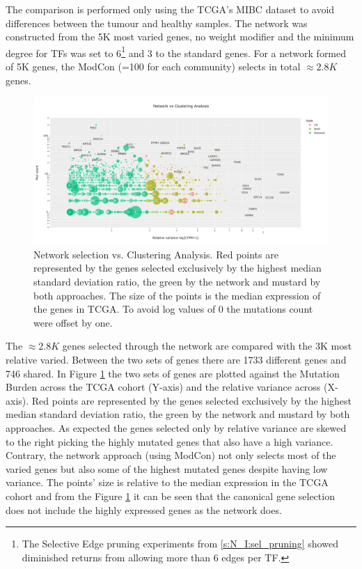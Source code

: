 The comparison is performed only using the TCGA's MIBC dataset to avoid differences between the tumour and healthy samples. The network was constructed from the 5K most varied genes, no weight modifier and the minimum degree for TFs  was set to 6\footnote{The Selective Edge pruning experiments from \cref{s:N_I:sel_pruning} showed diminished returns from allowing more than 6 edges per TF.} and 3 to the standard genes. For a network formed of 5K genes, the ModCon (=100 for each community) selects in total $\approx2.8K$ genes.


\begin{figure}[!t]    
    \centering\includegraphics[width=1.0\textwidth,keepaspectratio]{Sections/Network_I/Resources/Tum_network/ClusteringAnalysis_vs_Network_3.png}
    \caption{Network selection vs. Clustering Analysis. Red points are represented by the genes selected exclusively by the highest median standard deviation ratio, the green by the network and mustard by both approaches. The size of the points is the median expression of the genes in TCGA. To avoid log values of 0 the mutations count were offset by one.}
    \label{fig:N_I:network_ca_selection}
\end{figure}


The $\approx2.8K$ genes selected through the network are compared with the 3K most relative varied. Between the two sets of genes there are 1733 different genes and 746 shared. In Figure \ref{fig:N_I:network_ca_selection} the two sets of genes are plotted against the Mutation Burden across the TCGA cohort (Y-axis) and the relative variance across (X-axis). Red points are represented by the genes selected exclusively by the highest median standard deviation ratio, the green by the network and mustard by both approaches. As expected the genes selected only by relative variance are skewed to the right picking the highly mutated genes that also have a high variance. Contrary, the network approach (using ModCon) not only selects most of the varied genes but also some of the highest mutated genes despite having low variance. The points' size is relative to the median expression in the TCGA cohort and from the Figure \ref{fig:N_I:network_ca_selection} it can be seen that the canonical gene selection does not include the highly expressed genes as the network does.

